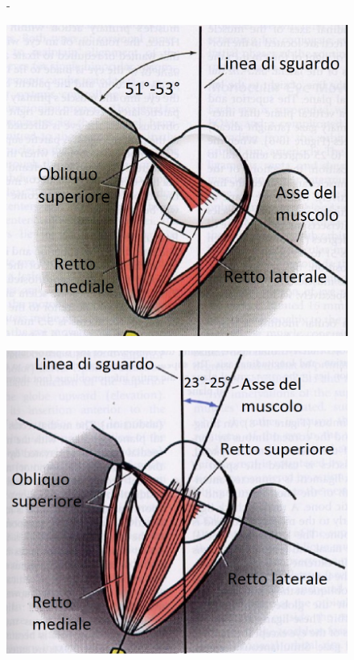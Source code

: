 \begin{figure}[h!]- 
\centering
\begin{minipage}{.5\textwidth}
  \centering
  \includegraphics[scale=0.25]{source/immagini/Assi_obliqui.png}
  \label{fig:test1}
\end{minipage}%
\begin{minipage}{.5\textwidth}
  \centering
  \includegraphics[scale=0.32]{source/immagini/Assi_retti.png}
  \label{fig:test2}
\end{minipage}
\end{figure} 

